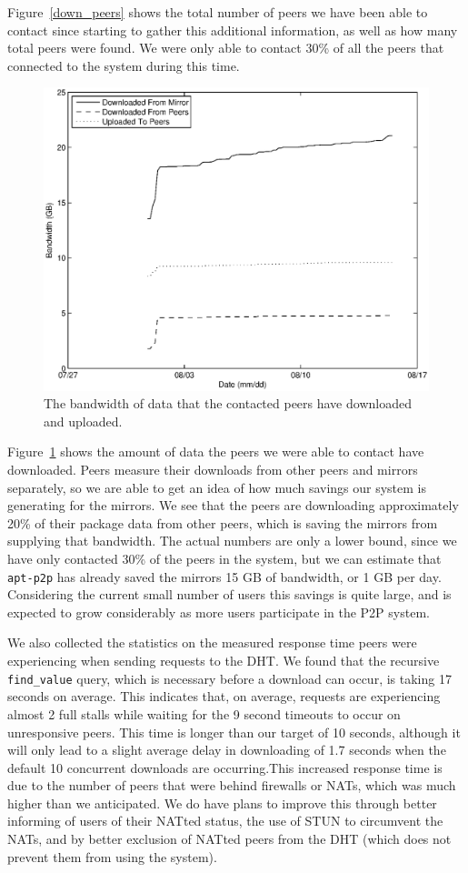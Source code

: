 \documentclass[conference]{IEEEtran}
\begin{document}
Figure~\ref{down_peers} shows the total number of peers we have been
able to contact since starting to gather this additional
information, as well as how many total peers were found. We were
only able to contact 30\% of all the peers that connected to the
system during this time.

\begin{figure}
\centering
\includegraphics[width=0.80\columnwidth]{AptP2PDownloaded-bw.eps}
\caption{The bandwidth of data that the contacted peers have
downloaded and uploaded.}
\label{down_bw}
\end{figure}

Figure~\ref{down_bw} shows the amount of data the peers we were able
to contact have downloaded. Peers measure their downloads from other
peers and mirrors separately, so we are able to get an idea of how
much savings our system is generating for the mirrors. We see that
the peers are downloading approximately 20\% of their package data
from other peers, which is saving the mirrors from supplying that
bandwidth. The actual numbers are only a lower bound, since we have
only contacted 30\% of the peers in the system, but we can estimate
that \texttt{apt-p2p} has already saved the mirrors 15 GB of
bandwidth, or 1 GB per day. Considering the current small number of
users this savings is quite large, and is expected to grow
considerably as more users participate in the P2P system.

We also collected the statistics on the measured response time peers
were experiencing when sending requests to the DHT. We found that
the recursive \texttt{find\_value} query, which is necessary before
a download can occur, is taking 17 seconds on average. This
indicates that, on average, requests are experiencing almost 2 full
stalls while waiting for the 9 second timeouts to occur on
unresponsive peers. This time is longer than our target of 10 seconds,
although it will only lead to a slight average delay in downloading
of 1.7 seconds when the default 10 concurrent downloads are
occurring.This increased response time is due to the number of peers
that were behind firewalls or NATs, which was much higher than we
anticipated. We do have plans to improve this through better
informing of users of their NATted status, the use of STUN
\cite{STUN} to circumvent the NATs, and by better exclusion of
NATted peers from the DHT (which does not prevent them from using
the system).
\end{document}
